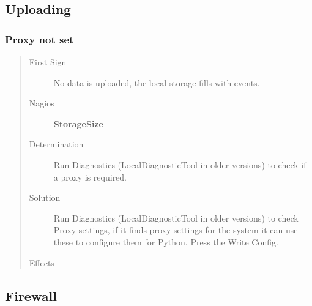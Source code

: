 \documentclass[a4paper,11pt,english]{sphinxmanual}
\begin{document}
\subsection{Uploading}
\label{known-issues:uploading}

\subsubsection{Proxy not set}
\label{known-issues:proxy-not-set}\begin{quote}\begin{description}
\item[{First Sign}] \leavevmode
No data is uploaded, the local storage fills with events.

\item[{Nagios}] \leavevmode
\textbf{StorageSize}

\item[{Determination}] \leavevmode
Run Diagnostics (LocalDiagnosticTool in older versions)
to check if a proxy is required.

\item[{Solution}] \leavevmode
Run Diagnostics (LocalDiagnosticTool in older versions) to
check Proxy settings, if it finds proxy settings for the
system it can use these to configure them for Python. Press
the Write Config.

\item[{Effects}] \leavevmode
\end{description}\end{quote}


\subsection{Firewall}
\label{known-issues:firewall}
\end{document}
